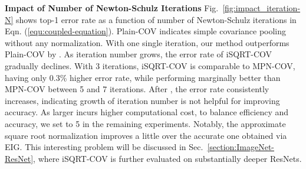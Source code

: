 \documentclass[10pt,twocolumn,letterpaper]{article}
\begin{document}
\vspace{4pt}\noindent\textbf{Impact of  Number  of Newton-Schulz Iterations}\quad 
Fig.~\ref{fig:impact_iteration-N} shows top-1 error rate as a function of  number  of Newton-Schulz iterations in Eqn.  (\ref{equ:coupled-equation}). Plain-COV indicates simple covariance pooling without any normalization. With one single iteration, our method outperforms Plain-COV by . As iteration number grows, the error rate of iSQRT-COV gradually declines. With 3 iterations, iSQRT-COV is comparable to MPN-COV, having only 0.3\% higher error rate, while performing marginally better than MPN-COV between 5 and 7 iterations. After , the error rate consistently increases, indicating growth of iteration number is not helpful for improving accuracy. As larger  incurs higher computational cost, to balance efficiency and accuracy, we set  to 5  in the remaining experiments. Notably, the approximate square root normalization improves a little over the accurate one obtained via EIG. This interesting problem will be discussed in  Sec.~\ref{section:ImageNet-ResNet}, where iSQRT-COV is further evaluated on substantially deeper ResNets.
\end{document}
